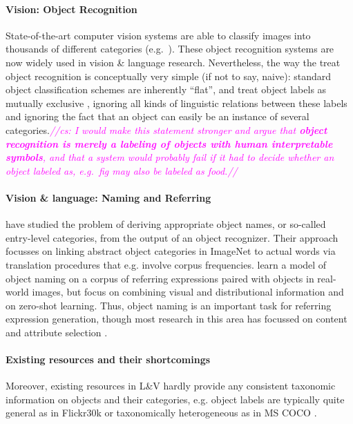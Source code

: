 \documentclass[11pt]{article}
\newcommand{\cs}[1]{\textcolor{Fuchsia}{\emph{//cs: #1//}}}
\newcommand{\refexp}[1]{\textsl{#1}}
\newcommand{\cat}[1]{\textsc{#1}}
\begin{document}
\paragraph{Vision: Object Recognition}

State-of-the-art computer vision systems are able to classify images into thousands of different categories (e.g.\  ). These object recognition systems are now widely used in vision \& language research.
Nevertheless, the way the treat object recognition is conceptually very simple (if not to say, naive):  standard object classification schemes are inherently ``flat'', and treat object labels as mutually exclusive \cite{deng2014large}, ignoring all kinds of linguistic relations between these labels and ignoring the fact that an object can easily be an instance of several categories.\cs{I would make this statement stronger and argue that \textbf{object recognition is merely a labeling of objects  with human interpretable symbols}, and that a system would probably fail if it had to decide whether an object labeled as, e.g.\ \refexp{fig} may also be labeled as \refexp{food}.}


\paragraph{Vision \& language: Naming and Referring}

 have studied the problem of deriving appropriate object names, or so-called entry-level
 categories, from the output of an object recognizer. Their approach focusses on linking abstract object categories in ImageNet to actual words via translation procedures that e.g. involve corpus frequencies. 
  learn a model of object naming on a corpus of referring expressions paired with objects in real-world images, but focus on combining visual and distributional information and on zero-shot learning.
 Thus, object naming is an important task for referring expression generation, though most research in this area has focussed on content and attribute selection \cite{Kazemzadeh2014,gkatzia:2015,zarrieschlang:easy-pre,Maoetal:cocorefexp}.

\paragraph{Existing resources and their shortcomings}
Moreover, existing resources in L\&V hardly provide any consistent taxonomic information on objects and their categories, e.g. object labels are typically quite general as in Flickr30k \cite[e.g.,~\cat{people, animals, bodyparts, clothing}]{plummer2015flickr30kentities} or taxonomically heterogeneous as in MS COCO \cite[e.g.,~\cat{people, baseball glove, bird}]{mscoco}.
\end{document}
